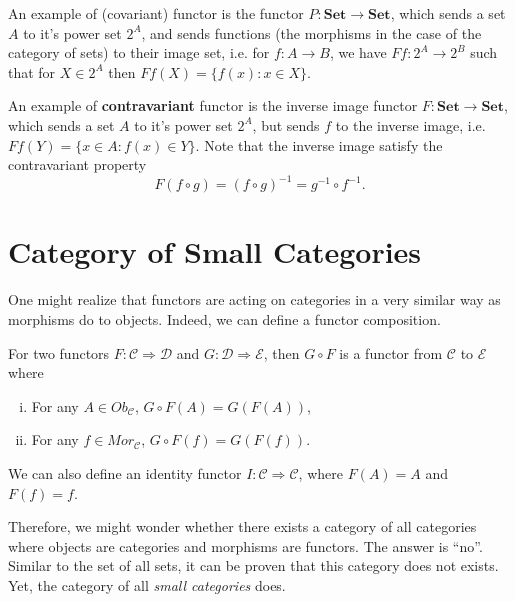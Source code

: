 \begin{example}
	An example of (covariant) functor is the functor
	$P : \mathbf{Set} \to \mathbf{Set}$, which sends a set $A$
	to it's power set $2^A$, and sends functions (the morphisms in the case
	of the category of sets) to their image set, i.e. for $f:A \to B$,
	we have $Ff:2^A \to 2^B$ such that for $X \in 2^A$ then $Ff(X) = \{f(x) : x \in X\}$.

	An example of \textbf{contravariant} functor is the inverse image functor
	$F : \mathbf{Set} \to \mathbf{Set}$, which sends a set $A$ to it's
	power set $2^A$, but sends $f$ to the inverse image, i.e.
	$Ff(Y) = \{x \in A : f(x) \in Y\}$.
	Note that the inverse image satisfy the contravariant property
	\begin{displaymath}
		F(f \circ g) = (f \circ g) ^{-1} = g^{-1} \circ f^{-1}.
	\end{displaymath}
\end{example}

\section{Category of Small Categories}

One might realize that functors are acting on categories in a very similar way as morphisms
do to objects. Indeed, we can define a functor composition.

\begin{definition}
	For two functors $F:\mathcal C \Rightarrow \mathcal D$
	and $G:\mathcal D \Rightarrow \mathcal E$, then $G \circ F$ is
	a functor from $\mathcal C$ to $\mathcal E$ where
	\begin{enumerate}[(i)]
		\item For any $A \in Ob_\mathcal C$, $G\circ F (A) = G(F(A))$,
		\item For any $f \in Mor_\mathcal C$, $G\circ F (f) = G(F(f))$.
	\end{enumerate}
\end{definition}
We can also define an identity functor $I:\mathcal C \Rightarrow \mathcal C$,
where $F(A) = A$ and $F(f) = f$.

Therefore, we might wonder whether there exists a category of all categories
where objects are categories and morphisms are functors.
The answer is ``no''. Similar to the set of all sets, it can be proven
that this category does not exists. Yet, the category of all \textit{small categories}
does.

